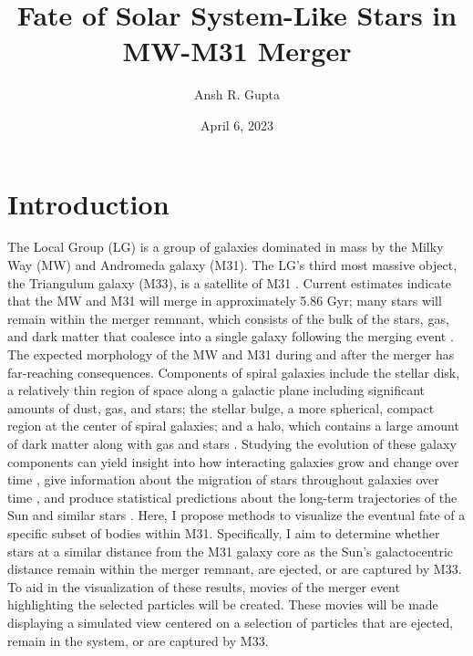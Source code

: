 \documentclass[twocolumn]{aastex631}
\begin{document}
\title{Fate of Solar System-Like Stars in MW-M31 Merger}

\author[0000-0003-4242-8606]{Ansh R. Gupta}
\date{April 6, 2023}


\section{Introduction} \label{sec:intro}

The Local Group (LG) is a group of galaxies dominated in mass by the Milky Way (MW) and Andromeda galaxy (M31). The LG's third most massive object, the Triangulum galaxy (M33), is a satellite of M31 \citep{2007gitu.book.....S}. Current estimates indicate that the MW and M31 will merge in approximately 5.86 Gyr; many stars will remain within the merger remnant, which consists of the bulk of the stars, gas, and dark matter that coalesce into a single galaxy following the merging event \citep{2012ApJ...753....9V}. The expected morphology of the MW and M31 during and after the merger has far-reaching consequences. Components of spiral galaxies include the stellar disk, a relatively thin region of space along a galactic plane including significant amounts of dust, gas, and stars; the stellar bulge, a more spherical, compact region at the center of spiral galaxies; and a halo, which contains a large amount of dark matter along with gas and stars \citep{2018MNRAS.478..611B}. Studying the evolution of these galaxy components can yield insight into how interacting galaxies grow and change over time \citep{2012ApJ...746..108T}, give information about the migration of stars throughout galaxies over time \citep{2012MNRAS.426.2089R}, and produce statistical predictions about the long-term trajectories of the Sun and similar stars \citep{2012ApJ...753....9V}. Here, I propose methods to visualize the eventual fate of a specific subset of bodies within M31. Specifically, I aim to determine whether stars at a similar distance from the M31 galaxy core as the Sun's galactocentric distance remain within the merger remnant, are ejected, or are captured by M33. To aid in the visualization of these results, movies of the merger event highlighting the selected particles will be created. These movies will be made displaying a simulated view centered on a selection of particles that are ejected, remain in the system, or are captured by M33.
\end{document}
